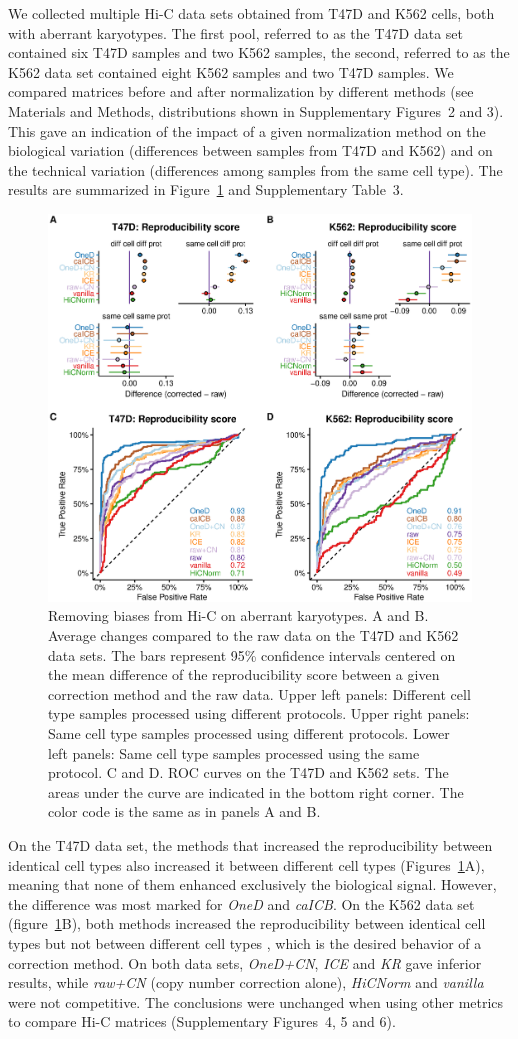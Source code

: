 \documentclass[a4,center,fleqn]{NAR}
\providecommand{\DIFadd}[1]{{\protect\color{red}#1}} %
\providecommand{\DIFdel}[1]{{\protect}}                      %
\providecommand{\DIFaddbegin}{} %
\providecommand{\DIFaddend}{} %
\providecommand{\DIFdelbegin}{} %
\providecommand{\DIFdelend}{} %
\begin{document}
We collected multiple Hi-C data sets obtained from T47D and K562 cells,
both with aberrant karyotypes. The first pool, referred to as the T47D data
set contained six T47D samples and two K562 samples, the second, referred
to as the K562 data set contained eight K562 samples and two T47D samples.
We compared matrices before and after normalization by different methods
(see Materials and Methods, distributions shown in Supplementary Figures~2
and 3). This gave an indication of the impact of a given normalization
method on the biological variation (differences between samples from T47D
and K562) and on the technical variation (differences among samples from
the same cell type). The results are summarized in
Figure~\ref{fig:aberrant} and Supplementary Table~3.

\begin{figure}
\centerline{\includegraphics[width=.49\textwidth]
  {figure_2.eps}}
\caption{Removing biases from Hi-C on aberrant karyotypes. A and B.
Average changes compared to the raw data on the T47D and K562 data sets.
The bars represent 95\% confidence intervals centered on the mean
difference of the reproducibility score between a given correction method
and the raw data. Upper left panels: Different cell type samples
processed using different protocols. Upper right panels: Same cell
type samples processed using different protocols. Lower left panels:
Same cell type samples processed using the same protocol. C and D. ROC
curves on the T47D and K562 sets. The areas under the curve are
indicated in the bottom right corner. The color code is the same as in
panels A and B.}
\label{fig:aberrant}
\end{figure}

On the T47D data set, the methods that increased the reproducibility
between identical cell types also increased it between different cell
types (Figures~\ref{fig:aberrant}A), meaning that none of them enhanced
exclusively the biological signal. However, the difference was most marked
for \textit{OneD} and \textit{caICB}. On the K562 data set
(figure~\ref{fig:aberrant}B), both methods increased the reproducibility
between identical cell types but not between different cell types
, which is the desired behavior of a
correction method. On both data sets, \textit{OneD+CN}, \textit{ICE} and
\textit{KR} gave inferior results, while \textit{raw+CN} (copy number
correction alone), \textit{\DIFdelbegin \DIFdel{LGF}\DIFdelend \DIFaddbegin \DIFadd{HiCNorm}\DIFaddend } and \textit{vanilla} were not competitive.
The conclusions were unchanged when using other metrics to compare Hi-C
matrices (Supplementary Figures~4, 5 and 6).
\end{document}
